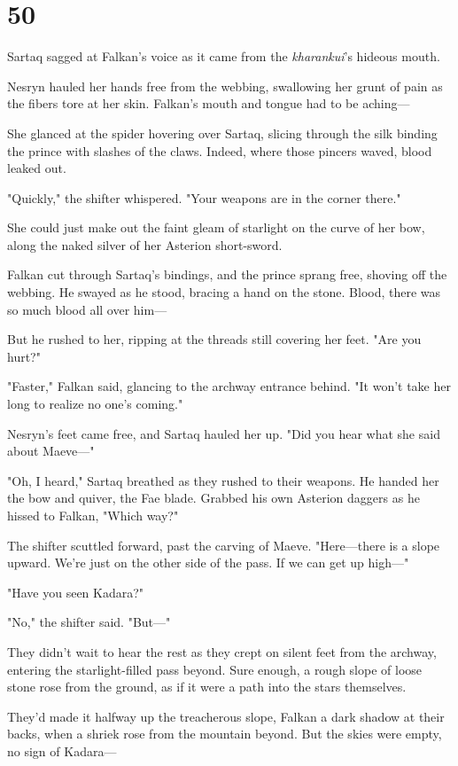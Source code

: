 
\chapter{50}

Sartaq sagged at Falkan's voice as it came from the \emph{kharankui}'s hideous mouth.

Nesryn hauled her hands free from the webbing, swallowing her grunt of pain as the fibers tore at her skin. Falkan's mouth and tongue had to be aching---

She glanced at the spider hovering over Sartaq, slicing through the silk binding the prince with slashes of the claws. Indeed, where those pincers waved, blood leaked out.

"Quickly," the shifter whispered. "Your weapons are in the corner there."

She could just make out the faint gleam of starlight on the curve of her bow, along the naked silver of her Asterion short-sword.

Falkan cut through Sartaq's bindings, and the prince sprang free, shoving off the webbing. He swayed as he stood, bracing a hand on the stone. Blood, there was so much blood all over him---

But he rushed to her, ripping at the threads still covering her feet. "Are you hurt?"

"Faster," Falkan said, glancing to the archway entrance behind. "It won't take her long to realize no one's coming."

Nesryn's feet came free, and Sartaq hauled her up. "Did you hear what she said about Maeve---"

"Oh, I heard," Sartaq breathed as they rushed to their weapons. He handed her the bow and quiver, the Fae blade. Grabbed his own Asterion daggers as he hissed to Falkan, "Which way?"

The shifter scuttled forward, past the carving of Maeve. "Here---there is a slope upward. We're just on the other side of the pass. If we can get up high---"

"Have you seen Kadara?"

"No," the shifter said. "But---"

They didn't wait to hear the rest as they crept on silent feet from the archway, entering the starlight-filled pass beyond. Sure enough, a rough slope of loose stone rose from the ground, as if it were a path into the stars themselves.

They'd made it halfway up the treacherous slope, Falkan a dark shadow at their backs, when a shriek rose from the mountain beyond. But the skies were empty, no sign of Kadara---

